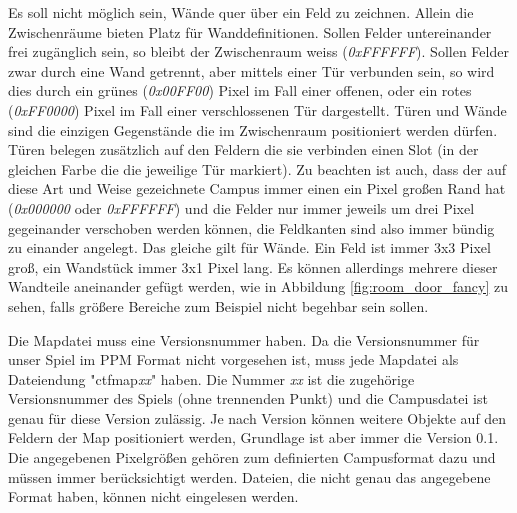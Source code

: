 Es soll nicht möglich sein, Wände quer über ein Feld zu zeichnen. Allein die Zwischenräume bieten Platz für
Wanddefinitionen. Sollen Felder untereinander frei zugänglich sein, so bleibt der Zwischenraum weiss 
(\textit{0xFFFFFF}). Sollen Felder zwar durch eine Wand getrennt, aber mittels einer Tür verbunden sein,
so wird dies durch ein grünes (\textit{0x00FF00}) Pixel im Fall einer offenen, oder ein rotes 
(\textit{0xFF0000}) Pixel im Fall einer verschlossenen Tür dargestellt. Türen und Wände sind die einzigen
Gegenstände die im Zwischenraum positioniert werden dürfen. Türen belegen zusätzlich auf den Feldern die sie
verbinden einen Slot (in der gleichen Farbe die die jeweilige Tür markiert). Zu beachten ist auch, dass der
auf diese Art und Weise gezeichnete Campus immer einen ein Pixel großen Rand hat (\textit{0x000000} oder
\textit{0xFFFFFF}) und die Felder nur immer jeweils um drei Pixel gegeinander verschoben werden können, die
Feldkanten sind also immer bündig zu einander angelegt. Das gleiche gilt für Wände. Ein Feld ist immer 3x3
Pixel groß, ein Wandstück immer 3x1 Pixel lang. Es können allerdings mehrere dieser Wandteile aneinander
gefügt werden, wie in Abbildung \ref{fig:room_door_fancy} zu sehen, falls größere Bereiche zum Beispiel nicht
begehbar sein sollen.

Die Mapdatei muss eine Versionsnummer haben. Da die Versionsnummer für unser Spiel im PPM Format nicht 
vorgesehen ist, muss jede Mapdatei als Dateiendung "ctfmap\textit{xx}" haben. Die Nummer \textit{xx} ist die 
zugehörige Versionsnummer des Spiels (ohne trennenden Punkt) und die Campusdatei ist genau für diese Version
zulässig. Je nach Version können weitere Objekte auf
den Feldern der Map positioniert werden, Grundlage ist aber immer die Version 0.1. Die angegebenen Pixelgrößen
gehören zum definierten Campusformat dazu und müssen immer berücksichtigt werden. Dateien, die nicht genau das
angegebene Format haben, können nicht eingelesen werden.
